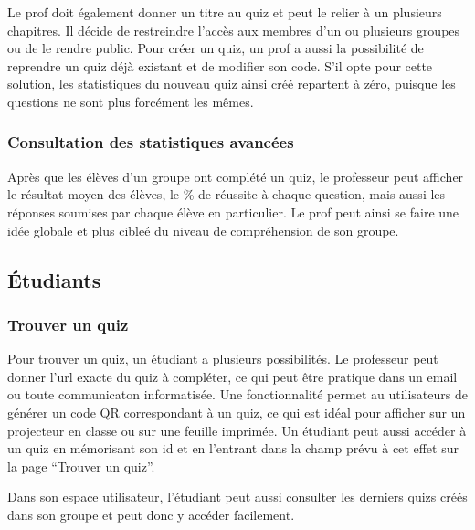 \documentclass[letterpaper,10pt,french]{sphinxmanual}
\begin{document}
Le prof doit également donner un titre au quiz et peut le relier à un plusieurs chapitres. Il décide de restreindre l'accès aux membres d'un ou plusieurs groupes ou de le rendre public. Pour créer un quiz, un prof a aussi la possibilité de reprendre un quiz déjà existant et de modifier son code. S'il opte pour cette solution, les statistiques du nouveau quiz ainsi créé repartent à zéro, puisque les questions ne sont plus forcément les mêmes.


\subsubsection{Consultation des statistiques avancées}
\label{documentation:consultation-des-statistiques-avancees}
Après que les élèves d'un groupe ont complété un quiz, le professeur peut afficher le résultat moyen des élèves, le \% de réussite à chaque question, mais aussi les réponses soumises par chaque élève en particulier. Le prof peut ainsi se faire une idée globale et plus cibleé du niveau de compréhension de son groupe.


\subsection{Étudiants}
\label{documentation:etudiants}

\subsubsection{Trouver un quiz}
\label{documentation:trouver-un-quiz}
Pour trouver un quiz, un étudiant a plusieurs possibilités. Le professeur peut donner l'url exacte du quiz à compléter, ce qui peut être pratique dans un email ou toute communicaton informatisée. Une fonctionnalité permet au utilisateurs de générer un code QR correspondant à un quiz, ce qui est idéal pour afficher sur un projecteur en classe ou sur une feuille imprimée. Un étudiant peut aussi accéder à un quiz en mémorisant son id et en l'entrant dans la champ prévu à cet effet sur la page ``Trouver un quiz''.

Dans son espace utilisateur, l'étudiant peut aussi consulter les derniers quizs créés dans son groupe et peut donc y accéder facilement.
\end{document}
